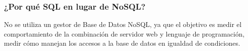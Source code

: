 \subsubsection{¿Por qué SQL en lugar de NoSQL?}
No se utiliza un gestor de Base de Datos NoSQL, ya que el objetivo es medir el comportamiento de
la combinación de servidor web y lenguaje de programación, medir cómo manejan los accesos a la base 
de datos en igualdad de condiciones.\\
\newpage